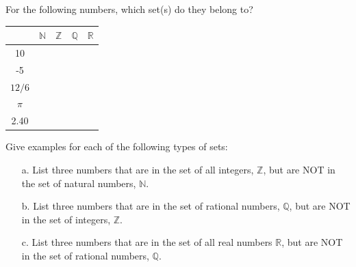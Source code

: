 \documentclass[a4paper,12pt]{book}
\newcounter{question}
\begin{document}
        \begin{questionNOGRADE}{\thequestion}

            For the following numbers, which set(s) do they belong to?

            \begin{center}
                \begin{tabular}{| c | c | c | c | c |}
                    \hline
                    & $\mathbb{N}$ & $\mathbb{Z}$ & $\mathbb{Q}$ & $\mathbb{R}$
                    \\ \hline
                    10 & & & &
                    \\ \hline
                    -5 & & & &
                    \\ \hline
                    $12/6$ & & & &
                    \\ \hline
                    $\pi$ & & & &
                    \\ \hline
                    2.40 & & & &
                    \\ \hline
                \end{tabular}
            \end{center}

        \end{questionNOGRADE}


        \begin{questionNOGRADE}{\thequestion}
            Give examples for each of the following types of sets:

            \begin{enumerate}
                \item[a.]   List three numbers that are in the
                    set of all integers, $\mathbb{Z}$,
                    but are NOT in the set of natural numbers,
                    $\mathbb{N}$.
                    \solution{}{ ~\\ }

                \item[b.]   List three numbers that are in the
                    set of rational numbers, $\mathbb{Q}$,
                    but are NOT in the set of integers,
                    $\mathbb{Z}$.
                    \solution{}{ ~\\ }

                \item[c.]   List three numbers that are in the
                    set of all real numbers $\mathbb{R}$,
                    but are NOT in the set of rational numbers,
                    $\mathbb{Q}$.
                    \solution{}{ ~\\ }
            \end{enumerate}
        \end{questionNOGRADE}
\end{document}
